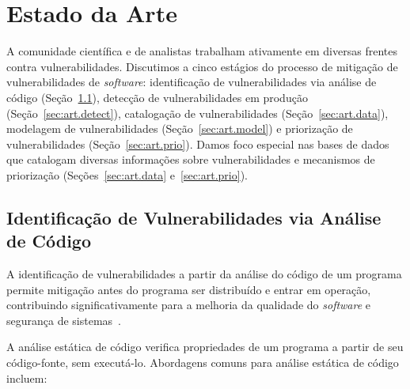 
\section{Estado da Arte}\label{sec:art}

A comunidade científica e de analistas trabalham ativamente em diversas frentes contra vulnerabilidades. Discutimos a cinco estágios do processo de mitigação de vulnerabilidades de \emph{software}: identificação de vulnerabilidades via análise de código (Seção~\ref{sec:art.ident}), detecção de vulnerabilidades em produção (Seção~\ref{sec:art.detect}), catalogação de vulnerabilidades (Seção~\ref{sec:art.data}), modelagem de vulnerabilidades (Seção~\ref{sec:art.model}) e priorização de vulnerabilidades (Seção~\ref{sec:art.prio}). Damos foco especial nas bases de dados que catalogam diversas informações sobre vulnerabilidades e mecanismos de priorização (Seções~\ref{sec:art.data} e~\ref{sec:art.prio}).


\subsection{Identificação de Vulnerabilidades via Análise de Código}\label{sec:art.ident}

A identificação de vulnerabilidades a partir da análise do código de um programa permite mitigação antes do programa ser distribuído e entrar em operação, contribuindo significativamente para a melhoria da qualidade do \emph{software} e segurança de sistemas~\cite{lin20vuln, zeng20vuln, semasaba20survey}.

A análise estática de código verifica propriedades de um programa a partir de seu código-fonte, sem executá-lo. Abordagens comuns para análise estática de código incluem:

